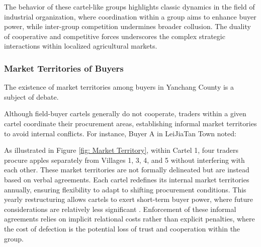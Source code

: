 \begin{quote}
\end{quote}

The behavior of these cartel-like groups highlights classic dynamics in the field of industrial organization, where coordination within a group aims to enhance buyer power, while inter-group competition undermines broader collusion. The duality of cooperative and competitive forces underscores the complex strategic interactions within localized agricultural markets.



\subsubsection{Market Territories of Buyers}
\noindent The existence of market territories among buyers in Yanchang County is a subject of debate.

Although field-buyer cartels generally do not cooperate, traders within a given cartel coordinate their procurement areas, establishing informal market territories to avoid internal conflicts. For instance, Buyer A in LeiJiaTan Town noted: 

\begin{quote}
\end{quote}

As illustrated in Figure \ref{fig: Market Territory}, within Cartel 1, four traders procure apples separately from Villages 1, 3, 4, and 5 without interfering with each other. These market territories are not formally delineated but are instead based on verbal agreements. Each cartel redefines its internal market territories annually, ensuring flexibility to adapt to shifting procurement conditions. This yearly restructuring allows cartels to exert short-term buyer power, where future considerations are relatively less significant \citep{sexton2013market}. Enforcement of these informal agreements relies on implicit relational costs rather than explicit penalties, where the cost of defection is the potential loss of trust and cooperation within the group.

